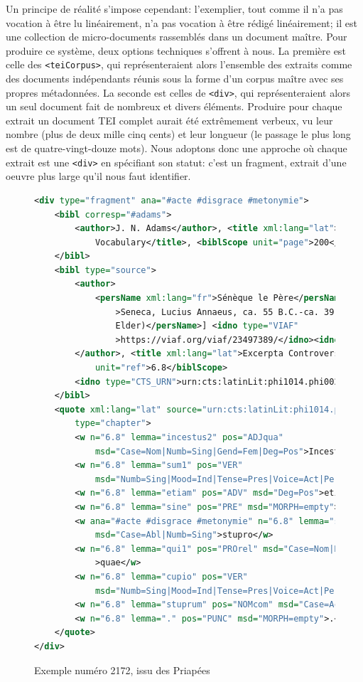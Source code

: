 Un principe de réalité s'impose cependant: l'exemplier, tout comme il n'a pas vocation à être lu linéairement, n'a pas vocation à être rédigé linéairement; il est une collection de micro-documents rassemblés dans un document maître. Pour produire ce système, deux options techniques s'offrent à nous. La première est celle des \texttt{<teiCorpus>}, qui représenteraient alors l'ensemble des extraits comme des documents indépendants réunis sous la forme d'un corpus maître avec ses propres métadonnées. La seconde est celles de \texttt{<div>}, qui représenteraient alors un seul document fait de nombreux et divers éléments. Produire pour chaque extrait un document TEI complet aurait été extrêmement verbeux, vu leur nombre (plus de deux mille cinq cents) et leur longueur (le passage le plus long  est de quatre-vingt-douze mots). Nous adoptons donc une approche où chaque extrait est une \texttt{<div>} en spécifiant son statut: c'est un fragment, extrait d'une oeuvre plus large qu'il nous faut identifier.

\begin{figure}
\begin{lstlisting}[language=XML]
<div type="fragment" ana="#acte #disgrace #metonymie">
    <bibl corresp="#adams">
        <author>J. N. Adams</author>, <title xml:lang="lat">The Latin Sexual
            Vocabulary</title>, <biblScope unit="page">200</biblScope>
    </bibl>
    <bibl type="source">
        <author>
            <persName xml:lang="fr">Sénèque le Père</persName> [<persName xml:lang="eng"
                >Seneca, Lucius Annaeus, ca. 55 B.C.-ca. 39 A.D. (Seneca the
                Elder)</persName>] <idno type="VIAF"
                >https://viaf.org/viaf/23497389/</idno><idno type="LC">n82-166595</idno>
        </author>, <title xml:lang="lat">Excerpta Controversiae</title>, <biblScope
            unit="ref">6.8</biblScope>
        <idno type="CTS_URN">urn:cts:latinLit:phi1014.phi002.perseus-lat1</idno>
    </bibl>
    <quote xml:lang="lat" source="urn:cts:latinLit:phi1014.phi002.perseus-lat1:6.8"
        type="chapter">
        <w n="6.8" lemma="incestus2" pos="ADJqua"
            msd="Case=Nom|Numb=Sing|Gend=Fem|Deg=Pos">Incesta</w>
        <w n="6.8" lemma="sum1" pos="VER"
            msd="Numb=Sing|Mood=Ind|Tense=Pres|Voice=Act|Person=3">est</w>
        <w n="6.8" lemma="etiam" pos="ADV" msd="Deg=Pos">etiam</w>
        <w n="6.8" lemma="sine" pos="PRE" msd="MORPH=empty">sine</w>
        <w ana="#acte #disgrace #metonymie" n="6.8" lemma="stuprum" pos="NOMcom"
            msd="Case=Abl|Numb=Sing">stupro</w>
        <w n="6.8" lemma="qui1" pos="PROrel" msd="Case=Nom|Numb=Sing|Gend=Fem"
            >quae</w>
        <w n="6.8" lemma="cupio" pos="VER"
            msd="Numb=Sing|Mood=Ind|Tense=Pres|Voice=Act|Person=3">cupit</w>
        <w n="6.8" lemma="stuprum" pos="NOMcom" msd="Case=Acc|Numb=Sing">stuprum</w>
        <w n="6.8" lemma="." pos="PUNC" msd="MORPH=empty">.</w>
    </quote>
</div>
\end{lstlisting}
    \caption{Exemple numéro 2172, issu des Priapées}
    \label{fig:chap1:part3:exemple_xml}
\end{figure}


